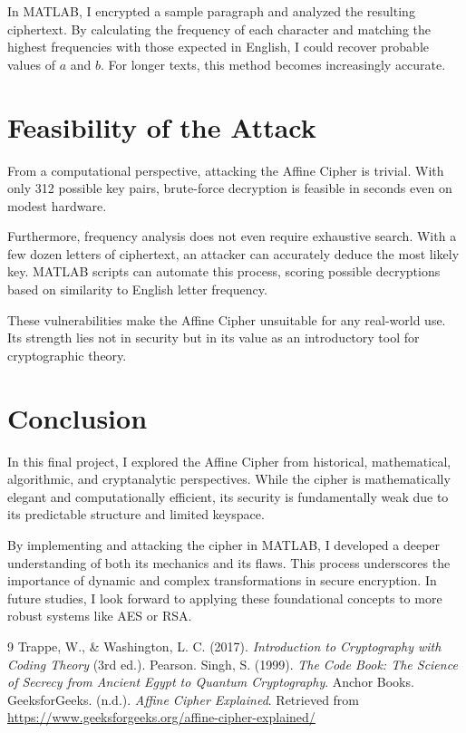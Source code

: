 \documentclass[12pt]{article}
\begin{document}
In MATLAB, I encrypted a sample paragraph and analyzed the resulting ciphertext. By calculating the frequency of each character and matching the highest frequencies with those expected in English, I could recover probable values of \( a \) and \( b \). For longer texts, this method becomes increasingly accurate.

\section*{Feasibility of the Attack}
From a computational perspective, attacking the Affine Cipher is trivial. With only 312 possible key pairs, brute-force decryption is feasible in seconds even on modest hardware.

Furthermore, frequency analysis does not even require exhaustive search. With a few dozen letters of ciphertext, an attacker can accurately deduce the most likely key. MATLAB scripts can automate this process, scoring possible decryptions based on similarity to English letter frequency.

These vulnerabilities make the Affine Cipher unsuitable for any real-world use. Its strength lies not in security but in its value as an introductory tool for cryptographic theory.

\section*{Conclusion}
In this final project, I explored the Affine Cipher from historical, mathematical, algorithmic, and cryptanalytic perspectives. While the cipher is mathematically elegant and computationally efficient, its security is fundamentally weak due to its predictable structure and limited keyspace.

By implementing and attacking the cipher in MATLAB, I developed a deeper understanding of both its mechanics and its flaws. This process underscores the importance of dynamic and complex transformations in secure encryption. In future studies, I look forward to applying these foundational concepts to more robust systems like AES or RSA.

\begin{thebibliography}{9}
Trappe, W., \& Washington, L. C. (2017). \textit{Introduction to Cryptography with Coding Theory} (3rd ed.). Pearson.
Singh, S. (1999). \textit{The Code Book: The Science of Secrecy from Ancient Egypt to Quantum Cryptography}. Anchor Books.
GeeksforGeeks. (n.d.). \textit{Affine Cipher Explained}. Retrieved from \url{https://www.geeksforgeeks.org/affine-cipher-explained/}
\end{thebibliography}
\end{document}
